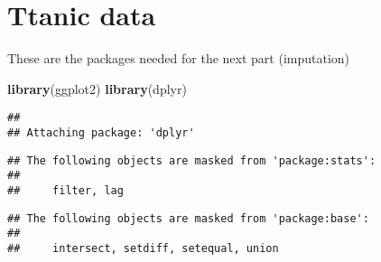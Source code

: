 \documentclass[
]{article}
\newenvironment{Shaded}{\begin{snugshade}}{\end{snugshade}}
\newcommand{\FunctionTok}[1]{\textcolor[rgb]{0.13,0.29,0.53}{\textbf{#1}}}
\newcommand{\NormalTok}[1]{#1}
\newcommand{\SpecialCharTok}[1]{\textcolor[rgb]{0.81,0.36,0.00}{\textbf{#1}}}
\begin{document}
\hypertarget{ttanic-data}{%
\section{Ttanic data}\label{ttanic-data}}

These are the packages needed for the next part (imputation)

\begin{Shaded}
\begin{Highlighting}[]
\FunctionTok{library}\NormalTok{(ggplot2)}
\FunctionTok{library}\NormalTok{(dplyr)}
\end{Highlighting}
\end{Shaded}

\begin{verbatim}
## 
## Attaching package: 'dplyr'
\end{verbatim}

\begin{verbatim}
## The following objects are masked from 'package:stats':
## 
##     filter, lag
\end{verbatim}

\begin{verbatim}
## The following objects are masked from 'package:base':
## 
##     intersect, setdiff, setequal, union
\end{verbatim}

\begin{Shaded}
\end{Shaded}
\end{document}

